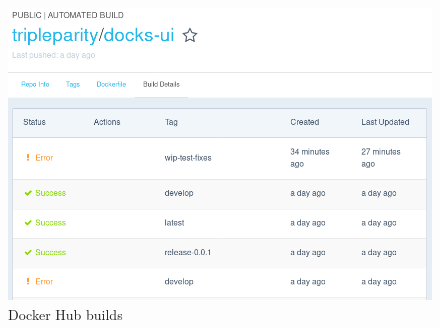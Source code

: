 \documentclass[]{article}
\begin{document}
\begin{figure}[h!]
	\centering
	\includegraphics[scale=0.5]{test_docker_hub.png}
	\caption{Docker Hub builds}
\end{figure}
\end{document}
